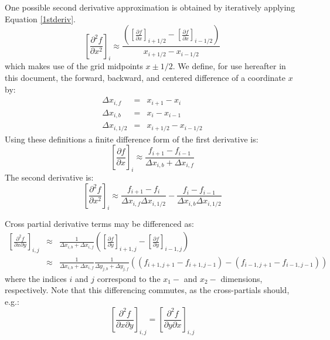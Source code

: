 \documentclass[11pt,letterpaper]{article}
\begin{document}
One possible second derivative approximation is obtained by iteratively applying Equation \ref{1stderiv}.  
\begin{equation}
\left[ \frac{\partial^2 f}{\partial x^2} \right]_i \approx \frac{\left( \left[ \frac{\partial f}{\partial x} \right]_{i+1/2} - \left[ \frac{\partial f}{\partial x} \right]_{i-1/2} \right)}{x_{i+1/2} - x_{i-1/2}} 
\end{equation}
which makes use of the grid midpoints $x\pm1/2$.  We define, for use hereafter in this document, the forward, backward, and centered difference of a coordinate $x$ by:
\begin{eqnarray}
\Delta x_{i,f} &=& x_{i+1} - x_i \nonumber \\
\Delta x_{i,b} &=& x_i - x_{i-1} \nonumber \\
\Delta x_{i,1/2} &=& x_{i+1/2} - x_{i-1/2} \nonumber
\end{eqnarray}
Using these definitions a finite difference form of the first derivative is:
\begin{equation}
\left[ \frac{\partial f}{\partial x} \right]_i \approx \frac{f_{i+1} - f_{i-1}}{\Delta x_{i,b}+\Delta x_{i,f}}
\end{equation}
The second derivative is:
\begin{equation}
\left[ \frac{\partial^2 f}{\partial x^2} \right]_i \approx \frac{f_{i+1} - f_i}{\Delta x_{i,f}\Delta x_{i,1/2}} - \frac{f_i - f_{i-1}}{\Delta x_{i,b}\Delta x_{i,1/2}}
\end{equation}

Cross partial derivative terms may be differenced as:
\begin{eqnarray}
\left[ \frac{\partial^2 f}{\partial x \partial y} \right]_{i,j} &\approx& \frac{1}{\Delta x_{i,b} + \Delta x_{i,f}}\left( \left[ \frac{\partial f}{\partial y} \right]_{i+1,j} - \left[ \frac{\partial f}{\partial y} \right]_{i-1,j} \right) \\
 &\approx& \frac{1}{\Delta x_{i,b} + \Delta x_{i,f}} \frac{1}{\Delta y_{j,b} + \Delta y_{j,f}} \left( \left( f_{i+1,j+1} - f_{i+1,j-1} \right) - \left( f_{i-1,j+1} - f_{i-1,j-1} \right) \right)
\end{eqnarray}
where the indices $i$ and $j$ correspond to the $x_1-$ and $x_2-$ dimensions, respectively.  Note that this differencing commutes, as the cross-partials should, e.g.:
\begin{equation}
\left[ \frac{\partial^2 f}{\partial x \partial y} \right]_{i,j} = \left[ \frac{\partial^2 f}{\partial y \partial x} \right]_{i,j}
\end{equation}
\end{document}
